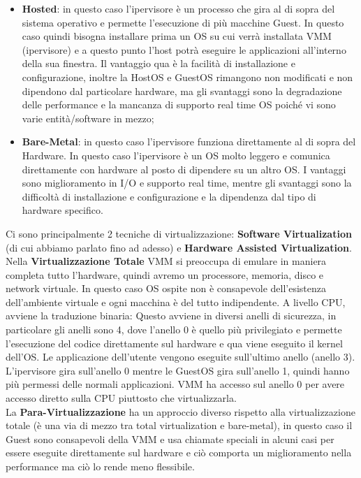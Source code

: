\documentclass[11pt, twocolumn]{article}
\newenvironment{myitemize}
{ \begin{itemize}[topsep=0ex]
		\setlength{\itemsep}{0pt}
		\setlength{\parskip}{0pt}
		\setlength{\parsep}{0pt}     }
	{ \end{itemize}                  }
\begin{document}
\begin{myitemize}
	\item \textbf{Hosted}: in questo caso l'ipervisore è un processo che gira al di sopra del sistema operativo e permette l'esecuzione di più macchine Guest.
	In questo caso quindi bisogna installare prima un OS su cui verrà installata VMM (ipervisore) e a questo punto l'host potrà eseguire le applicazioni all'interno della sua finestra.
	Il vantaggio qua è la facilità di installazione e configurazione, inoltre la HostOS e GuestOS rimangono non modificati e non dipendono dal particolare hardware, ma gli svantaggi sono la degradazione delle performance e la mancanza di supporto real time OS poiché vi sono varie entità/software in mezzo;
	\item \textbf{Bare-Metal}: in questo caso l'ipervisore funziona direttamente al di sopra del Hardware.
	In questo caso l'ipervisore è un OS molto leggero e comunica direttamente con hardware al posto di dipendere su un altro OS. 
	I vantaggi sono miglioramento in I/O e supporto real time, mentre gli svantaggi sono la difficoltà di installazione e configurazione e la dipendenza dal tipo di hardware specifico.
\end{myitemize}
Ci sono principalmente 2 tecniche di virtualizzazione: \textbf{Software Virtualization} (di cui abbiamo parlato fino ad adesso) e \textbf{Hardware Assisted Virtualization}.\\
Nella \textbf{Virtualizzazione Totale} VMM si preoccupa di emulare in maniera completa tutto l'hardware, quindi avremo un processore, memoria, disco e network virtuale.
In questo caso OS ospite non è consapevole dell'esistenza dell'ambiente virtuale e ogni macchina è del tutto indipendente.
A livello CPU, avviene la traduzione binaria: Questo avviene in diversi anelli di sicurezza, in particolare gli anelli sono 4, dove l'anello 0 è quello più privilegiato e permette l'esecuzione del codice direttamente sul hardware e qua viene eseguito il kernel dell'OS.
Le applicazione dell'utente vengono eseguite sull'ultimo anello (anello 3).\\
L'ipervisore gira sull'anello 0 mentre le GuestOS gira sull'anello 1, quindi hanno più permessi delle normali applicazioni. 
VMM ha accesso sul anello 0 per avere accesso diretto sulla CPU piuttosto che virtualizzarla. \\
La \textbf{Para-Virtualizzazione} ha un approccio diverso rispetto alla virtualizzazione totale (è una via di mezzo tra total virtualization e bare-metal), in questo caso il Guest sono consapevoli della VMM e usa chiamate speciali in alcuni casi per essere eseguite direttamente sul hardware e ciò comporta un miglioramento nella performance ma ciò lo rende meno flessibile.\\
\end{document}

